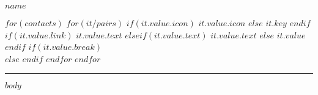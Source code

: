 \documentclass[10pt]{article}
\begin{document}
{%
\centering\huge{\textbf{\uppercase{$name$}}} \\
\hfill
}

\vspace{-1em}

\begin{center}
$for(contacts)$
  $for(it/pairs)$
    $if(it.value.icon)$
      \fa$it.value.icon$
    $else$
      \textbf{$it.key$}
    $endif$
    \hspace{0.3em}
    $if(it.value.link)$
      \href{$it.value.link$}{$it.value.text$}
    $elseif(it.value.text)$
      {$it.value.text$}
    $else$
      {$it.value$}
    $endif$
    $if(it.value.break)$
      \\
    $else$
      \>
    $endif$
  $endfor$
$endfor$
\end{center}

\vspace{-1em}

\textcolor{lightgray}{\rule{\textwidth}{0.05pt}}

\vspace{-.5em}

$body$
\end{document}
